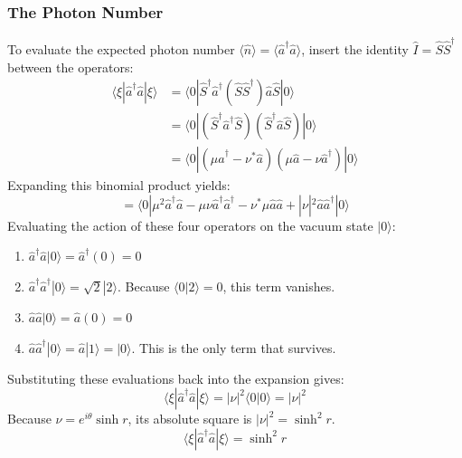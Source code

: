 {\subsubsection{The Photon Number}
To evaluate the expected photon number $\langle\hat{n}\rangle = \langle \hat{a}^\dagger \hat{a} \rangle$, insert the identity $\hat{I} = \hat{S}\hat{S}^\dagger$ between the operators:
\begin{align*}
\langle \xi | \hat{a}^\dagger\hat{a} | \xi \rangle &= \langle 0 | \hat{S}^\dagger \hat{a}^\dagger (\hat{S}\hat{S}^\dagger) \hat{a} \hat{S} | 0 \rangle \\
&= \langle 0 | (\hat{S}^\dagger \hat{a}^\dagger \hat{S}) (\hat{S}^\dagger \hat{a} \hat{S}) | 0 \rangle \\
&= \langle 0 | (\mu\hat{a}^\dagger - \nu^*\hat{a})(\mu\hat{a} - \nu\hat{a}^\dagger) | 0 \rangle
\end{align*}
Expanding this binomial product yields:
\begin{equation*}
= \langle 0 | \mu^2 \hat{a}^\dagger\hat{a} - \mu\nu \hat{a}^\dagger\hat{a}^\dagger - \nu^*\mu \hat{a}\hat{a} + |\nu|^2 \hat{a}\hat{a}^\dagger | 0 \rangle
\end{equation*}
Evaluating the action of these four operators on the vacuum state $|0\rangle$:
\begin{enumerate}
    \item $\hat{a}^\dagger\hat{a} | 0 \rangle = \hat{a}^\dagger (0) = 0$
    \item $\hat{a}^\dagger\hat{a}^\dagger | 0 \rangle = \sqrt{2} | 2 \rangle$. Because $\langle 0 | 2 \rangle = 0$, this term vanishes.
    \item $\hat{a}\hat{a} | 0 \rangle = \hat{a} (0) = 0$
    \item $\hat{a}\hat{a}^\dagger | 0 \rangle = \hat{a} | 1 \rangle = | 0 \rangle$. This is the only term that survives.
\end{enumerate}
Substituting these evaluations back into the expansion gives:
\begin{equation*}
\langle \xi | \hat{a}^\dagger\hat{a} | \xi \rangle = |\nu|^2 \langle 0 | 0 \rangle = |\nu|^2
\end{equation*}
Because $\nu = e^{i\theta}\sinh r$, its absolute square is $|\nu|^2 = \sinh^2 r$.
\begin{equation}
\langle \xi | \hat{a}^\dagger\hat{a} | \xi \rangle = \sinh^2 r
\end{equation}

}
